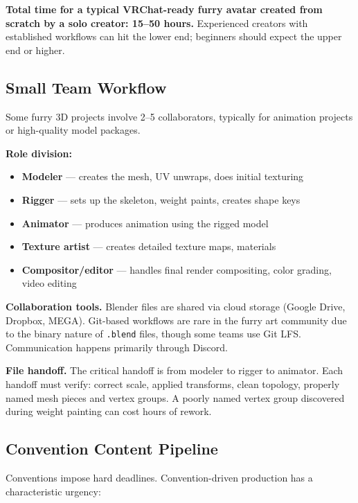 \begin{furrybox}
\textbf{Total time for a typical VRChat-ready furry avatar created from scratch by a solo creator: 15--50 hours.} Experienced creators with established workflows can hit the lower end; beginners should expect the upper end or higher.
\end{furrybox}


\subsection{Small Team Workflow}

Some furry 3D projects involve 2--5 collaborators, typically for animation projects or high-quality model packages.

\textbf{Role division:}

\begin{itemize}[leftmargin=2em]
  \item \textbf{Modeler} --- creates the mesh, UV unwraps, does initial texturing
  \item \textbf{Rigger} --- sets up the skeleton, weight paints, creates shape keys
  \item \textbf{Animator} --- produces animation using the rigged model
  \item \textbf{Texture artist} --- creates detailed texture maps, materials
  \item \textbf{Compositor/editor} --- handles final render compositing, color grading, video editing
\end{itemize}

\textbf{Collaboration tools.} Blender files are shared via cloud storage (Google Drive, Dropbox, MEGA). Git-based workflows are rare in the furry art community due to the binary nature of \texttt{.blend} files, though some teams use Git LFS. Communication happens primarily through Discord.

\textbf{File handoff.} The critical handoff is from modeler to rigger to animator. Each handoff must verify: correct scale, applied transforms, clean topology, properly named mesh pieces and vertex groups. A poorly named vertex group discovered during weight painting can cost hours of rework.


\subsection{Convention Content Pipeline}

Conventions impose hard deadlines. Convention-driven production has a characteristic urgency:

